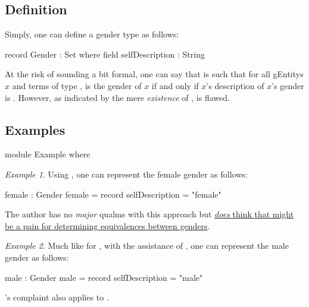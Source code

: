 \documentclass{article}
\theoremstyle{remark}
\newtheorem{example}{Example}
\begin{document}
\subsection{Definition}\label{sec:gender1definition}
Simply, one can define a gender type  as follows:

\begin{code}
  record Gender : Set where
    field
      selfDescription : String
\end{code}

At the risk of sounding a bit formal, one can say that  is such that for all \glspl{gEntity} \(x\) and terms  of type ,  is the gender of \(x\) if and only if \(x\)'s description of \(x\)'s gender is  .  However, as indicated by the mere \emph{existence} of ,  is flawed.

\subsection{Examples}

\begin{code}
  module Example where
\end{code}

\begin{example}\label{example:gender1exampleFemale}
  Using , one can represent the female gender as follows:

  \begin{code}
    female : Gender
    female = record {selfDescription = "female"}
  \end{code}

  The author has no \emph{major} qualms with this approach but \hyperref[enum:gender1stringComparison]{\emph{does} think that  might be a pain for determining equivalences between genders}.
\end{example}

\begin{example}
  Much like for , with the assistance of , one can represent the male gender as follows:

  \begin{code}
    male : Gender
    male = record {selfDescription = "male"}
\end{code}

's  complaint also applies to .
\end{example}
\end{document}

